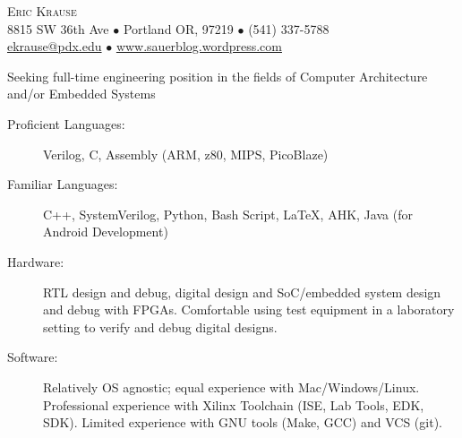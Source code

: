 \documentclass{article}
\begin{document}
\thispagestyle{firststyle} %
\small

\vspace*{-.5in} %

\begin{center}
	{\LARGE \scshape {Eric Krause}}	\\
	8815 SW 36th Ave $\bullet$ Portland OR, 97219  $\bullet$ (541) 337-5788\\
	\url{ekrause@pdx.edu}  $\bullet$  \url{www.sauerblog.wordpress.com}\\
\end{center}

	\hspace{-10pt} Seeking full-time engineering position in the fields of Computer Architecture and/or Embedded Systems

	\hspace{-10pt}
  \vspace{3pt}

	\vspace{3pt}

	
	\vspace{-15pt}
	\begin{description}
		\item[Proficient Languages:] Verilog, C, Assembly (ARM, z80, MIPS, PicoBlaze)
		\item[Familiar Languages:] C++, SystemVerilog, Python, Bash Script, \LaTeX, AHK, Java (for Android Development)
		\item[Hardware:] RTL design and debug, digital design and SoC/embedded system design and debug with FPGAs.  Comfortable using test equipment in a laboratory setting to verify and debug digital designs.
		\item[Software:] Relatively OS agnostic; equal experience with Mac/Windows/Linux.  Professional experience with Xilinx Toolchain (ISE, Lab Tools, EDK, SDK).  Limited experience with GNU tools (Make, GCC) and VCS (git).
	\end{description}
	\vspace{-4pt}
\end{document}
